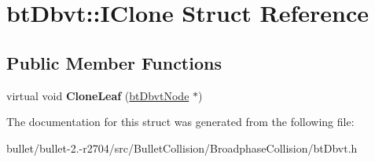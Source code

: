 \hypertarget{structbt_dbvt_1_1_i_clone}{\section{bt\+Dbvt\+:\+:I\+Clone Struct Reference}
\label{structbt_dbvt_1_1_i_clone}
}
\subsection*{Public Member Functions}
\begin{DoxyCompactItemize}
\item 
\hypertarget{structbt_dbvt_1_1_i_clone_a46d26b138398281c542d54d51fc3f565}{virtual void {\bfseries Clone\+Leaf} (\hyperlink{structbt_dbvt_node}{bt\+Dbvt\+Node} $\ast$)}\label{structbt_dbvt_1_1_i_clone_a46d26b138398281c542d54d51fc3f565}

\end{DoxyCompactItemize}


The documentation for this struct was generated from the following file\+:\begin{DoxyCompactItemize}
\item 
bullet/bullet-\/2.-\/r2704/src/\+Bullet\+Collision/\+Broadphase\+Collision/bt\+Dbvt.\+h\end{DoxyCompactItemize}
